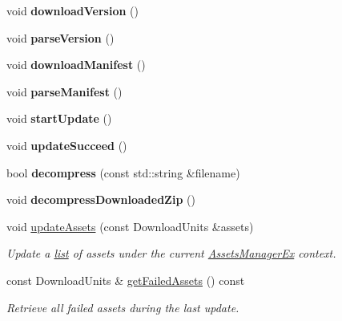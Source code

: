 \begin{DoxyCompactItemize}
void {\bfseries download\+Version} ()
\item 
\mbox{\label{classAssetsManagerEx_a8410062b500c6cdaf9d3634523333642}} 
void {\bfseries parse\+Version} ()
\item 
\mbox{\label{classAssetsManagerEx_aec0e59a5165b1d9387620a4beec027ac}} 
void {\bfseries download\+Manifest} ()
\item 
\mbox{\label{classAssetsManagerEx_addefe7c8c80a4455fb20b8a7436c1f00}} 
void {\bfseries parse\+Manifest} ()
\item 
\mbox{\label{classAssetsManagerEx_a9e9ec71020d3f9f3efef411666eff6b4}} 
void {\bfseries start\+Update} ()
\item 
\mbox{\label{classAssetsManagerEx_a9e1a7f5f3e1b144810515967a396eab8}} 
void {\bfseries update\+Succeed} ()
\item 
\mbox{\label{classAssetsManagerEx_a7949bee801d7de84b7673f035cc81b91}} 
bool {\bfseries decompress} (const std\+::string \&filename)
\item 
\mbox{\label{classAssetsManagerEx_a91c8bfdc688c27461b4ff4bf1d9160b8}} 
void {\bfseries decompress\+Downloaded\+Zip} ()
\item 
\mbox{\label{classAssetsManagerEx_ac1ff9e745a237249951709f764e56c3b}} 
void \hyperlink{classAssetsManagerEx_ac1ff9e745a237249951709f764e56c3b}{update\+Assets} (const Download\+Units \&assets)
\begin{DoxyCompactList}\small\item\em Update a \hyperlink{protocollist-p}{list} of assets under the current \hyperlink{classAssetsManagerEx}{Assets\+Manager\+Ex} context. \end{DoxyCompactList}\item 
\mbox{\label{classAssetsManagerEx_a39a060d2175535e16ec3d59d1d3d82cd}} 
const Download\+Units \& \hyperlink{classAssetsManagerEx_a39a060d2175535e16ec3d59d1d3d82cd}{get\+Failed\+Assets} () const
\begin{DoxyCompactList}\small\item\em Retrieve all failed assets during the last update. \end{DoxyCompactList}\item 

\end{DoxyCompactItemize}
